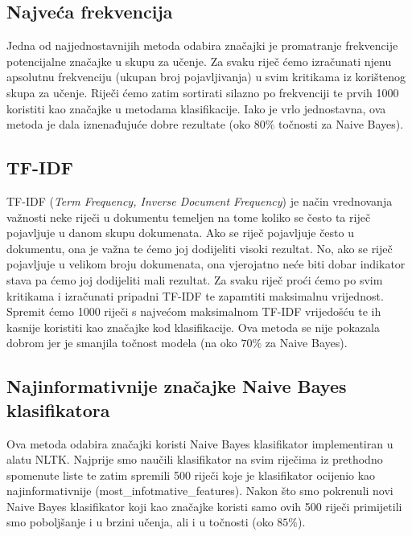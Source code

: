 \documentclass[conference]{IEEEtran}
\begin{document}
\subsection{Najveća frekvencija}

Jedna od najjednostavnijih metoda odabira značajki je promatranje frekvencije potencijalne značajke u skupu za učenje. Za svaku riječ ćemo izračunati njenu apsolutnu frekvenciju (ukupan broj pojavljivanja) u svim kritikama iz korištenog skupa za učenje. Riječi ćemo zatim sortirati silazno po frekvenciji te prvih 1000 koristiti kao značajke u metodama klasifikacije. Iako je vrlo jednostavna, ova metoda je dala iznenađujuće dobre rezultate (oko $80\%$ točnosti za Naive Bayes).

\subsection{TF-IDF}

TF-IDF (\textit{Term Frequency, Inverse Document Frequency}) je način vrednovanja važnosti neke riječi u dokumentu temeljen na tome koliko se često ta riječ pojavljuje u danom skupu dokumenata. Ako se riječ pojavljuje često u dokumentu, ona je važna te ćemo joj dodijeliti visoki rezultat. No, ako se riječ pojavljuje u velikom broju dokumenata, ona vjerojatno neće biti dobar indikator stava pa ćemo joj dodijeliti mali rezultat. Za svaku riječ proći ćemo po svim kritikama i izračunati pripadni TF-IDF te zapamtiti maksimalnu vrijednost. Spremit ćemo 1000 riječi s najvećom maksimalnom TF-IDF vrijedošću te ih kasnije koristiti kao značajke kod klasifikacije. Ova metoda se nije pokazala dobrom jer je smanjila točnost modela (na oko $70\%$ za Naive Bayes).

\subsection{Najinformativnije značajke Naive Bayes klasifikatora}

Ova metoda odabira značajki koristi Naive Bayes klasifikator implementiran u alatu NLTK. Najprije smo naučili klasifikator na svim riječima iz prethodno spomenute liste te zatim spremili 500 riječi koje je klasifikator ocijenio kao najinformativnije (most\_infotmative\_features). Nakon što smo pokrenuli novi Naive Bayes klasifikator koji kao značajke koristi samo ovih 500 riječi primijetili smo poboljšanje i u brzini učenja, ali i u točnosti (oko $85\%$).
\end{document}

